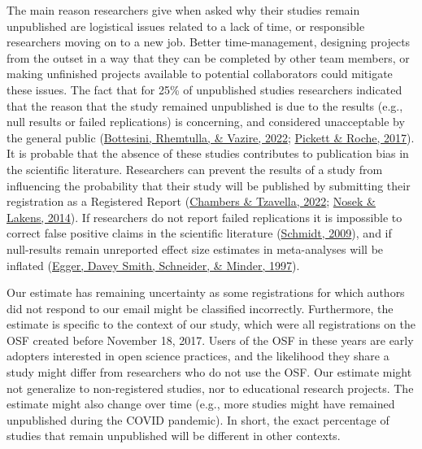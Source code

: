 \documentclass[
  ,jou, a4paper,floatsintext]{apa6}
\begin{document}
The main reason researchers give when asked why their studies remain unpublished are logistical issues related to a lack of time, or responsible researchers moving on to a new job. Better time-management, designing projects from the outset in a way that they can be completed by other team members, or making unfinished projects available to potential collaborators could mitigate these issues. The fact that for 25\% of unpublished studies researchers indicated that the reason that the study remained unpublished is due to the results (e.g., null results or failed replications) is concerning, and considered unacceptable by the general public (\protect\hyperlink{ref-bottesini_what_2022}{Bottesini, Rhemtulla, \& Vazire, 2022}; \protect\hyperlink{ref-pickett_questionable_2017}{Pickett \& Roche, 2017}). It is probable that the absence of these studies contributes to publication bias in the scientific literature. Researchers can prevent the results of a study from influencing the probability that their study will be published by submitting their registration as a Registered Report (\protect\hyperlink{ref-chambers_past_2022}{Chambers \& Tzavella, 2022}; \protect\hyperlink{ref-nosek_registered_2014}{Nosek \& Lakens, 2014}). If researchers do not report failed replications it is impossible to correct false positive claims in the scientific literature (\protect\hyperlink{ref-schmidt_shall_2009}{Schmidt, 2009}), and if null-results remain unreported effect size estimates in meta-analyses will be inflated (\protect\hyperlink{ref-egger_bias_1997}{Egger, Davey Smith, Schneider, \& Minder, 1997}).

Our estimate has remaining uncertainty as some registrations for which authors did not respond to our email might be classified incorrectly. Furthermore, the estimate is specific to the context of our study, which were all registrations on the OSF created before November 18, 2017. Users of the OSF in these years are early adopters interested in open science practices, and the likelihood they share a study might differ from researchers who do not use the OSF. Our estimate might not generalize to non-registered studies, nor to educational research projects. The estimate might also change over time (e.g., more studies might have remained unpublished during the COVID pandemic). In short, the exact percentage of studies that remain unpublished will be different in other contexts.
\end{document}
